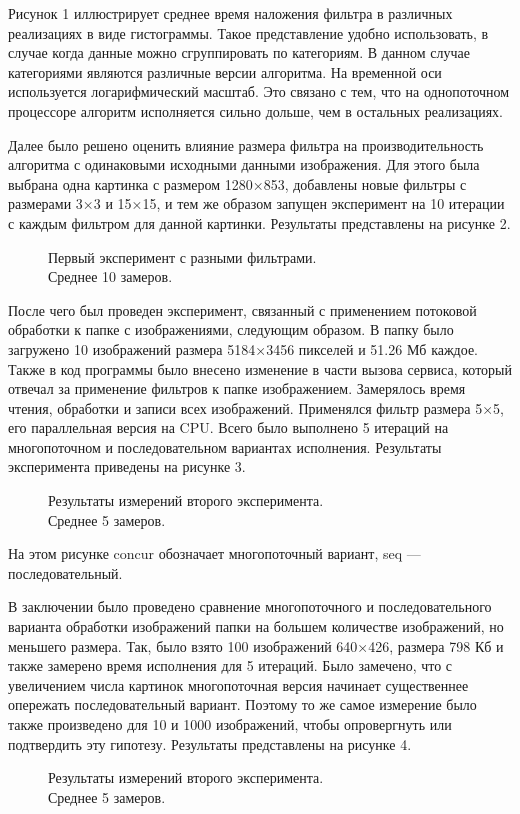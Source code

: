 Рисунок 1 иллюстрирует среднее время наложения фильтра в различных реализациях в виде гистограммы. Такое представление удобно использовать, 
в случае когда данные можно сгруппировать по категориям. В данном случае категориями являются различные версии алгоритма. На временной 
оси используется логарифмический масштаб. Это связано с тем, что на однопоточном процессоре алгоритм исполняется сильно дольше, чем в 
остальных реализациях.

Далее было решено оценить влияние размера фильтра на производительность алгоритма с одинаковыми исходными данными изображения. Для 
этого была выбрана одна картинка с размером 1280×853, добавлены новые фильтры с размерами 3×3 и 15×15, и тем же образом запущен эксперимент 
на 10 итерации с каждым фильтром для данной картинки. Результаты представлены на рисунке 2.

\begin{figure}[ht]
\begin{center}
\caption{\label{com-Youtube}Первый эксперимент с разными фильтрами.\\Среднее 10 замеров.}
\end{center}
\end{figure}

После чего был проведен эксперимент, связанный с применением потоковой обработки к папке с изображениями, следующим образом. 
В папку было загружено 10 изображений размера 5184×3456 пикселей и 51.26 Мб каждое. Также в код программы было внесено изменение 
в части вызова сервиса, который отвечал за применение фильтров к папке изображением. Замерялось время чтения, обработки и записи 
всех изображений. Применялся фильтр размера 5×5, его параллельная версия на CPU. Всего было выполнено 5 итераций на многопоточном и 
последовательном вариантах исполнения. Результаты эксперимента приведены на рисунке 3.

\begin{figure}[ht]
\begin{center}
\caption{\label{com-Youtube}Результаты измерений второго эксперимента.\\Среднее 5 замеров.}
\end{center}
\end{figure}

На этом рисунке concur обозначает многопоточный вариант, seq --- последовательный.

В заключении было проведено сравнение многопоточного и последовательного варианта обработки изображений папки на большем количестве 
изображений, но меньшего размера. Так, было взято 100 изображений 640×426, размера 798 Кб и также замерено время исполнения для 5 
итераций. Было замечено, что с увеличением числа картинок многопоточная версия начинает существеннее опережать последовательный вариант. 
Поэтому то же самое измерение было также произведено для 10 и 1000 изображений, чтобы опровергнуть или подтвердить эту гипотезу. 
Результаты представлены на рисунке 4.

\begin{figure}[ht]
\begin{center}
\caption{\label{com-Youtube}Результаты измерений второго эксперимента.\\Среднее 5 замеров.}
\end{center}
\end{figure}